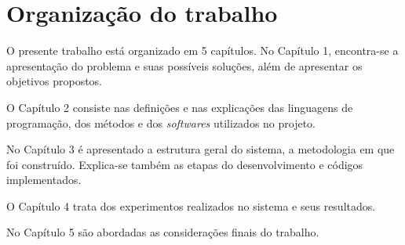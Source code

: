 \section{Organização do trabalho}

O presente trabalho está organizado em 5 capítulos. No Capítulo 1, encontra-se
a apresentação do problema e suas possíveis soluções, além de apresentar os objetivos
propostos.

O Capítulo 2 consiste nas definições e nas explicações das linguagens de programação, dos métodos e dos \textit{softwares} utilizados no projeto.

No Capítulo 3 é apresentado a estrutura geral do sistema, a metodologia em que foi construído. Explica-se também as etapas do desenvolvimento e códigos implementados.

O Capítulo 4 trata dos experimentos realizados no sistema e seus resultados.

No Capítulo 5 são abordadas as considerações finais do trabalho.